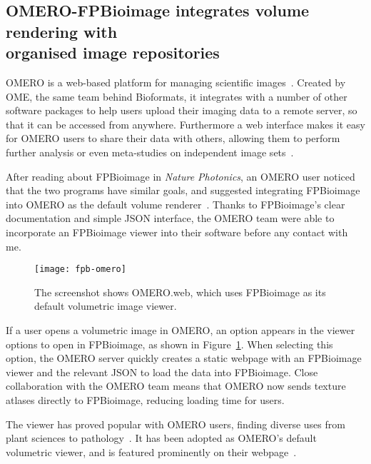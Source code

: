 \subsection[OMERO-FPBioimage integrates volume rendering with organised image repositories]{OMERO-FPBioimage integrates volume rendering with\\ organised image repositories}
OMERO is a web-based platform for managing scientific images~\cite{moore2015omero}.
Created by OME, the same team behind Bioformats, it integrates with a number of other software packages to help users upload their imaging data to a remote server, so that it can be accessed from anywhere.
Furthermore a web interface makes it easy for OMERO users to share their data with others, allowing them to perform further analysis or even meta-studies on independent image sets~\cite{williams2017image}.

After reading about FPBioimage in \textit{Nature Photonics}, an OMERO user noticed that the two programs have similar goals, and suggested integrating FPBioimage into OMERO as the default volume renderer~\cite{ehrenfeuchter2017comment}.
Thanks to FPBioimage's clear documentation and simple JSON interface, the OMERO team were able to incorporate an FPBioimage viewer into their software before any contact with me.

\begin{figure}[htbp!]
\centering
\texttt{[image: fpb-omero]}
\caption[FPBioimage: OMERO.web uses FPBioimage as its default renderer for 3D data]{The screenshot shows OMERO.web, which uses FPBioimage as its default volumetric image viewer. } %
\label{fig:fpbOMERO}
\end{figure}

If a user opens a volumetric image in OMERO, an option appears in the viewer options to open in FPBioimage, as shown in Figure~\ref{fig:fpbOMERO}.
When selecting this option, the OMERO server quickly creates a static webpage with an FPBioimage viewer and the relevant JSON to load the data into FPBioimage.
Close collaboration with the OMERO team means that OMERO now sends texture atlases directly to FPBioimage, reducing loading time for users.

The viewer has proved popular with OMERO users, finding diverse uses from plant sciences to pathology~\cite{fleur2018fpbioimage}.
It has been adopted as OMERO's default volumetric viewer, and is featured prominently on their webpage~\cite{omero2018website}.

